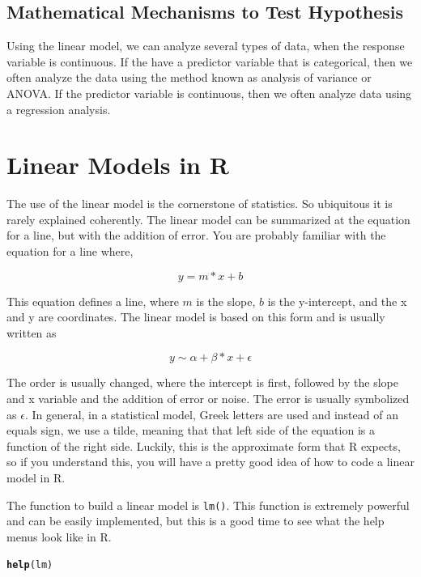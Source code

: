 \documentclass{article}\usepackage[]{graphicx}\usepackage[]{color}
\makeatletter
\newcommand{\hlstd}[1]{\textcolor[rgb]{0.345,0.345,0.345}{#1}}%
\newcommand{\hlkwd}[1]{\textcolor[rgb]{0.737,0.353,0.396}{\textbf{#1}}}%
\newenvironment{kframe}{%
 \def\at@end@of@kframe{}%
 \ifinner\ifhmode%
  \def\at@end@of@kframe{\end{minipage}}%
  \begin{minipage}{\columnwidth}%
 \fi\fi%
 \def\FrameCommand##1{\hskip\@totalleftmargin \hskip-\fboxsep
 \colorbox{shadecolor}{##1}\hskip-\fboxsep
     \hskip-\linewidth \hskip-\@totalleftmargin \hskip\columnwidth}%
 \MakeFramed {\advance\hsize-\width
   \@totalleftmargin\z@ \linewidth\hsize
   \@setminipage}}%
 {\par\unskip\endMakeFramed%
 \at@end@of@kframe}
\newenvironment{knitrout}{}{} %
\makeatother
\begin{document}
\subsection{Mathematical Mechanisms to Test Hypothesis}

Using the linear model, we can analyze several types of data, when the response variable is continuous. If the have a predictor variable that is categorical, then we often analyze the data using the method known as analysis of variance or ANOVA. If the predictor variable is continuous, then we often analyze data using a regression analysis.

\section{Linear Models in R}

The use of the linear model is the cornerstone of statistics. So ubiquitous it is rarely explained coherently. The linear model can be summarized at the equation for a line, but with the addition of error. You are probably familiar with the equation for a line where, 

\begin{equation}
y = m * x + b
\end{equation}

This equation defines a line, where $m$ is the slope, $b$ is the y-intercept, and the x and y are coordinates. The linear model is based on this form and is usually written as  

\begin{equation}
y \sim \alpha + \beta * x + \epsilon
\end{equation}

The order is usually changed, where the intercept is first, followed by the slope and x variable and the addition of error or noise. The error is usually symbolized as $\epsilon$. In general, in a statistical model, Greek letters are used and instead of an equals sign, we use a tilde, meaning that that left side of the equation is a function of the right side. Luckily, this is the approximate form that R expects, so if you understand this, you will have a pretty good idea of how to code a linear model in R. 

The function to build a linear model is \texttt{lm()}. This function is extremely powerful and can be easily implemented, but this is a good time to see what the help menus look like in R. 

\begin{knitrout}
\color{fgcolor}\begin{kframe}
\begin{alltt}
\hlkwd{help}\hlstd{(lm)}
\end{alltt}
\end{kframe}
\end{knitrout}
\end{document}
